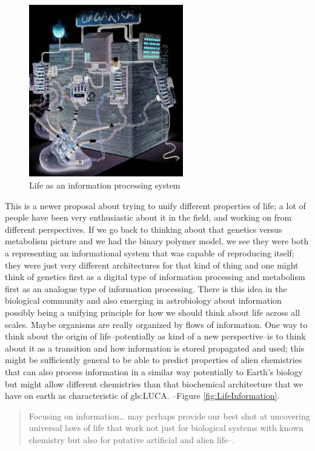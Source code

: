 \documentclass[]{article}
\begin{document}
\begin{figure}[H]
	\begin{center}
		\caption[Life as an information processing system]{Life as an information processing system\cite{nurse2008life}}\label{fig:nurse-information}
		\includegraphics[width=0.6\textwidth]{nurse-information}
	\end{center}
\end{figure}


This is a newer proposal about trying to
unify different properties of life; 
a lot of people have been very
enthusiastic about it in the field,
and working on from
different perspectives. If we go back
to thinking about that genetics versus
metabolism picture
and we had the binary polymer model, we see they were both
a representing an informational
system that was capable of reproducing
itself; they were just very different
architectures for that kind of thing and
one might think of genetics first as a
digital type of information processing
and metabolism first as an analogue type
of information processing.
There is this idea in the biological
community and also emerging in
astrobiology about information possibly
being a unifying principle for how we
should think about life across all
scales.  Maybe organisms are
really organized by flows of information.
One way to think about the origin of
life--potentially as kind of a new
perspective--is to think about it as a
transition and how information is stored
propagated and used; this might be
sufficiently general to be able to
predict properties of alien chemistries
that can also process information in a
similar way potentially to Earth's
biology but might allow different
chemistries than that biochemical
architecture that we have on earth as
characteristic
of \gls{gls:LUCA}.
--Figure \ref{fig:LifeInformation}.
\begin{quotation}
	Focusing on information… may perhaps provide our best shot at uncovering universal laws of life that work not just for biological systems with known chemistry but also for putative artificial and alien life--\cite{cronin2016beyond}.
\end{quotation}
\end{document}
